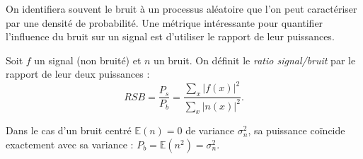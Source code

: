 On identifiera souvent le bruit à un processus aléatoire que l'on peut caractériser par une densité de probabilité. Une métrique intéressante pour quantifier l'influence du bruit sur un signal est d'utiliser le rapport de leur puissances. 

\begin{definition}
    Soit $f$ un signal (non bruité) et $n$ un bruit. On définit le \emph{ratio signal/bruit} par le rapport de leur deux puissances : 
    \begin{equation}
        RSB = \frac{P_s}{P_b} = \frac{ \sum_x |f(x)|^2}{ \sum_{x} |n(x)|^2}. 
    \end{equation}
\end{definition}

\begin{remark}
    Dans le cas d'un bruit centré $ \mathbb{E}(n) = 0$ de variance $ \sigma^2_n$, sa puissance coïncide exactement avec sa variance : $ P_b = \mathbb{E}(n^2) = \sigma^2_n$. 
\end{remark}

